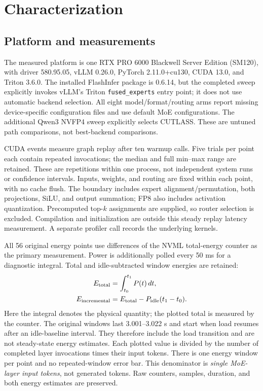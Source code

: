 \documentclass[10pt,twocolumn]{article}
\begin{document}
\section{Characterization}
\subsection{Platform and measurements}
The measured platform is one RTX PRO 6000 Blackwell Server Edition (SM120),
with driver 580.95.05, vLLM 0.26.0, PyTorch 2.11.0+cu130, CUDA 13.0, and
Triton 3.6.0. The installed FlashInfer package is 0.6.14, but the completed
sweep explicitly invokes vLLM's Triton \texttt{fused\_experts} entry point;
it does not use automatic backend selection. All eight model/format/routing
arms report missing device-specific configuration files and use default MoE
configurations. The additional Qwen3 NVFP4 sweep explicitly selects CUTLASS.
These are untuned path comparisons, not best-backend comparisons.

CUDA events measure graph replay after ten warmup calls. Five trials per
point each contain repeated invocations; the median and full min--max range
are retained. These are repetitions within one process, not independent
system runs or confidence intervals. Inputs, weights, and routing are fixed
within each point, with no cache flush. The boundary includes expert
alignment/permutation, both projections, SiLU, and output summation; FP8
also includes activation quantization. Precomputed top-$k$ assignments are
supplied, so router selection is excluded. Compilation and initialization
are outside this steady replay latency measurement. A separate profiler call
records the underlying kernels.

All 56 original energy points use differences of the NVML total-energy counter as
the primary measurement. Power is additionally polled every 50 ms for a
diagnostic integral. Total and idle-subtracted window energies are retained:
\begin{align}
 E_{\rm total}&=\int_{t_0}^{t_1}P(t)\,dt,\\
 E_{\rm incremental}&=E_{\rm total}-P_{\rm idle}(t_1-t_0).
\end{align}
Here the integral denotes the physical quantity; the plotted total is
measured by the counter. The original windows last 3.001--3.022 s and start
when load resumes after an idle-baseline interval. They therefore include
the load transition and are not steady-state energy estimates. Each plotted
value is divided by the number of completed layer invocations times their
input tokens. There is one energy window per point and no repeated-window
error bar. This denominator is \emph{single MoE-layer input tokens}, not
generated tokens. Raw counters, samples, duration, and both energy estimates
are preserved.
\end{document}
